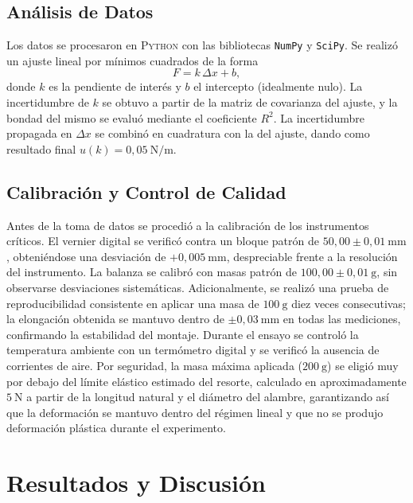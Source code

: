 \documentclass[conference,10pt]{IEEEtran}
\begin{document}
\subsection{Análisis de Datos}
Los datos se procesaron en \textsc{Python} con las bibliotecas
\texttt{NumPy} y \texttt{SciPy}. Se realizó un ajuste lineal por
mínimos cuadrados de la forma
\begin{equation}
  F = k\,\Delta x + b,
  \label{eq:ajuste}
\end{equation}
donde $k$ es la pendiente de interés y $b$ el intercepto
(idealmente nulo). La incertidumbre de $k$ se obtuvo a partir de la
matriz de covarianza del ajuste, y la bondad del mismo se evaluó
mediante el coeficiente $R^2$. La incertidumbre propagada en
$\Delta x$ se combinó en cuadratura con la del ajuste, dando como
resultado final
$u(k) = 0{,}05\ \mathrm{N/m}$.

\subsection{Calibración y Control de Calidad}
Antes de la toma de datos se procedió a la calibración de los
instrumentos críticos. El vernier digital se verificó contra un bloque
patrón de $50{,}00 \pm 0{,}01\ \mathrm{mm}$, obteniéndose una
desviación de $+0{,}005\ \mathrm{mm}$, despreciable frente a la
resolución del instrumento. La balanza se calibró con masas patrón
de $100{,}00 \pm 0{,}01\ \mathrm{g}$, sin observarse desviaciones
sistemáticas. Adicionalmente, se realizó una prueba de
reproducibilidad consistente en aplicar una masa de $100\ \mathrm{g}$
diez veces consecutivas; la elongación obtenida se mantuvo dentro de
$\pm 0{,}03\ \mathrm{mm}$ en todas las mediciones, confirmando la
estabilidad del montaje. Durante el ensayo se controló la temperatura
ambiente con un termómetro digital y se verificó la ausencia de
corrientes de aire. Por seguridad, la masa máxima aplicada
($200\ \mathrm{g}$) se eligió muy por debajo del límite elástico
estimado del resorte, calculado en aproximadamente $5\ \mathrm{N}$ a
partir de la longitud natural y el diámetro del alambre, garantizando
así que la deformación se mantuvo dentro del régimen lineal y que no
se produjo deformación plástica durante el experimento.

\section{Resultados y Discusión}
\label{sec:res}
\end{document}
